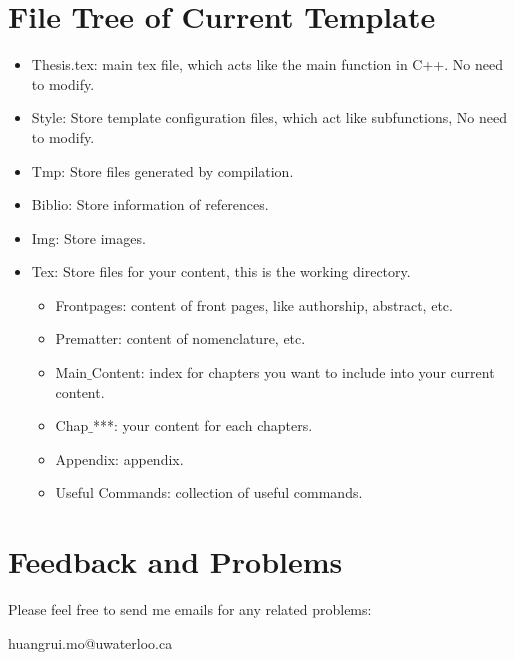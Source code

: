 \section{File Tree of Current Template} %
\begin{itemize}
    \item Thesis.tex: main tex file, which acts like the main function in C++. No need to modify.
    \item Style: Store template configuration files, which act like subfunctions, No need to modify.
    \item Tmp: Store files generated by compilation.
    \item Biblio: Store information of references.
    \item Img: Store images.
    \item Tex: Store files for your content, this is the working directory.
        \begin{itemize}
            \item Frontpages: content of front pages, like authorship, abstract, etc.
            \item Prematter: content of nomenclature, etc.
            \item Main$\_$Content: index for chapters you want to include into your current content.
            \item Chap$\_$***: your content for each chapters.
            \item Appendix: appendix.
            \item Useful Commands: collection of useful commands.
        \end{itemize}
\end{itemize}

\section{Feedback and Problems} %
Please feel free to send me emails for any related problems:
\begin{center}
huangrui.mo@uwaterloo.ca
\end{center}
